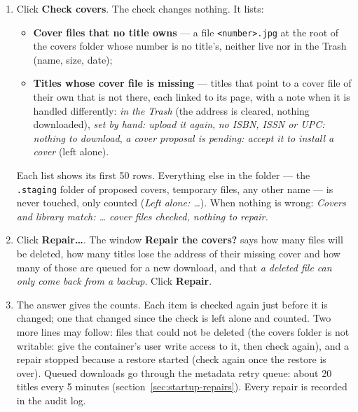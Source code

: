 \begin{enumerate}
  \item Click \textbf{Check covers}. The check changes nothing. It
        lists:
        \begin{itemize}
          \item \textbf{Cover files that no title owns} --- a file
                \texttt{<number>.jpg} at the root of the covers folder
                whose number is no title's, neither live nor in the
                Trash (name, size, date);
          \item \textbf{Titles whose cover file is missing} --- titles
                that point to a cover file of their own that is not
                there, each linked to its page, with a note when it is
                handled differently: \emph{in the Trash} (the address is
                cleared, nothing downloaded), \emph{set by hand: upload
                it again}, \emph{no ISBN, ISSN or UPC: nothing to
                download}, \emph{a cover proposal is pending: accept it
                to install a cover} (left alone).
        \end{itemize}
        Each list shows its first 50 rows. Everything else in the folder
        --- the \texttt{.staging} folder of proposed covers, temporary
        files, any other name --- is never touched, only counted
        (\emph{Left alone: \dots}). When nothing is wrong: \emph{Covers and
        library match: \dots{} cover files checked, nothing to repair.}
  \item Click \textbf{Repair…}. The window \textbf{Repair the covers?}
        says how many files will be deleted, how many titles lose the
        address of their missing cover and how many of those are queued
        for a new download, and that \emph{a deleted file can only come
        back from a backup}. Click \textbf{Repair}.
  \item The answer gives the counts. Each item is checked again just
        before it is changed; one that changed since the check is left
        alone and counted. Two more lines may follow: files that could
        not be deleted (the covers folder is not writable: give the
        container's user write access to it, then check again), and a
        repair stopped because a restore started (check again once the
        restore is over). Queued downloads go through the metadata
        retry queue: about 20 titles every 5 minutes
        (section~\ref{sec:startup-repairs}). Every repair is recorded
        in the audit log.
\end{enumerate}

